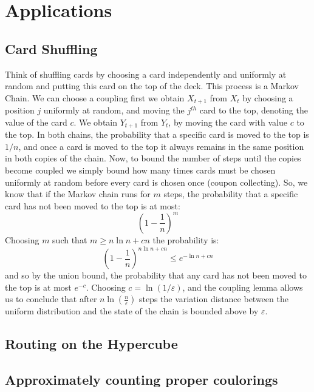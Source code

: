 \documentclass[11pt]{article}
\begin{document}
\section{Applications}
\subsection{Card Shuffling}
Think of shuffling cards by choosing a card independently and uniformly at random and putting this card on the top of the deck. This process is a Markov Chain. We can choose a coupling first we obtain \(X_{t+1}\) from \(X_{t}\) by choosing a position \(j\) uniformly at random, and moving the \(j^{th}\) card to the top, denoting the value of the card \(c\). We obtain \(Y_{t+1}\) from \(Y_t\), by moving the card with value \(c\) to the top. In both chains, the probability that a specific card is moved to the top is \(1/n\), and once a card is moved to the top it always remains in the same position in both copies of the chain. 
Now, to bound the number of steps until the copies become coupled we simply bound how many times cards must be chosen uniformly at random before every card is chosen once (coupon collecting). So, we know that if the Markov chain runs for \(m\) steps, the probability that a specific card has not been moved to the top is at most:
\begin{equation}
\left(1-\frac{1}{n}\right)^m
\end{equation}
Choosing \(m\) such that \(m \geq n\ln{n} + cn\) the probability is:
\begin{equation}
\left(1-\frac{1}{n}\right)^{n\ln{n} + cn} \leq e^{-\ln{n} + cn}
\end{equation}
and so by the union bound, the probability that any card has not been moved to the top is at most \(e^{-c}\). Choosing \(c = \ln{\left(1/\varepsilon\right)}\), and the coupling lemma allows us to conclude that after \(n\ln{\left(\frac{n}{\varepsilon}\right)}\) steps the variation distance between the uniform distribution and the state of the chain is bounded above by \(\varepsilon\).
\subsection{Routing on the Hypercube}
\subsection{Approximately counting proper coulorings}
\end{document}
